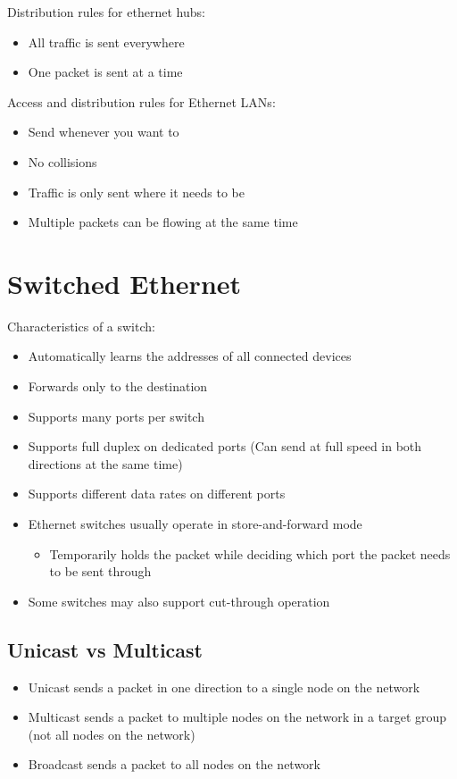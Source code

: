Distribution rules for ethernet hubs:
\begin{itemize}
  \item All traffic is sent everywhere
  \item One packet is sent at a time
\end{itemize}
  
Access and distribution rules for Ethernet LANs:
\begin{itemize}
  \item Send whenever you want to
  \item No collisions
  \item Traffic is only sent where it needs to be
  \item Multiple packets can be flowing at the same time
\end{itemize}

\section*{Switched Ethernet}
  
Characteristics of a switch:
\begin{itemize}
  \item Automatically learns the addresses of all connected devices
  \item Forwards only to the destination
  \item Supports many ports per switch
  \item Supports full duplex on dedicated ports (Can send at full speed in both directions at the same time)
  \item Supports different data rates on different ports
  \item Ethernet switches usually operate in store-and-forward mode
  \begin{itemize}
    \item Temporarily holds the packet while deciding which port the packet needs to be sent through
  \end{itemize}
  \item Some switches may also support cut-through operation
\end{itemize}

\subsection*{Unicast vs Multicast}

\begin{itemize}
  \item Unicast sends a packet in one direction to a single node on the network
  \item Multicast sends a packet to multiple nodes on the network in a target group (not all nodes on the network)
  \item Broadcast sends a packet to all nodes on the network
\end{itemize}

